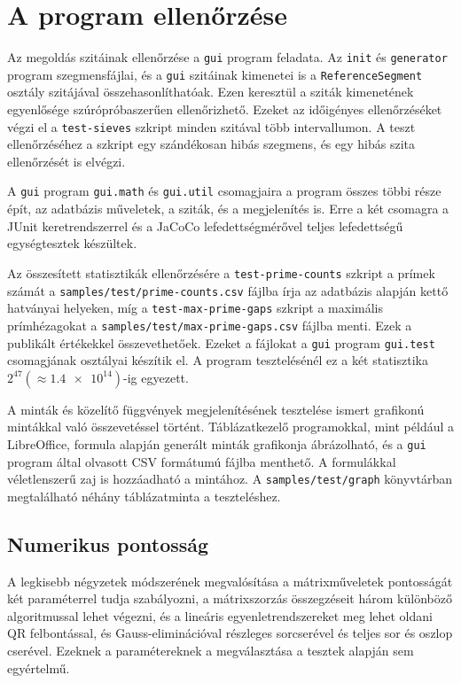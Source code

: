 \pagebreak
\section{A program ellenőrzése}

Az megoldás szitáinak ellenőrzése a \texttt{gui} program feladata.
Az \texttt{init} és \texttt{generator} program szegmensfájlai, és a \texttt{gui} szitáinak kimenetei is a \texttt{ReferenceSegment} osztály szitájával összehasonlíthatóak.
Ezen keresztül a sziták kimenetének egyenlősége szúrópróbaszerűen ellenőrizhető.
Ezeket az időigényes ellenőrzéséket végzi el a \texttt{test-sieves} szkript minden szitával több intervallumon.
A teszt ellenőrzéséhez a szkript egy szándékosan hibás szegmens, és egy hibás szita ellenőrzését is elvégzi.

A \texttt{gui} program \texttt{gui.math} és \texttt{gui.util} csomagjaira a program összes többi része épít, az adatbázis műveletek, a sziták, és a megjelenítés is. Erre a két csomagra a JUnit keretrendszerrel és a JaCoCo lefedettségmérővel teljes lefedettségű egységtesztek készültek.

Az összesített statisztikák ellenőrzésére a \texttt{test-prime-counts} szkript a prímek számát a \texttt{samples/test/prime-counts.csv} fájlba írja az adatbázis alapján kettő hatványai helyeken, míg a \texttt{test-max-prime-gaps} szkript a maximális prímhézagokat a \texttt{samples/test/max-prime-gaps.csv} fájlba menti.
Ezek a publikált értékekkel\cite{gaps}\cite{pi} összevethetőek.
Ezeket a fájlokat a \texttt{gui} program \texttt{gui.test} csomagjának osztályai készítik el.
A program tesztelésénél ez a két statisztika $2^{47}(\approx \num{1,4e14})$-ig egyezett.

A minták és közelítő függvények megjelenítésének tesztelése ismert grafikonú mintákkal való összevetéssel történt.
Táblázatkezelő programokkal, mint például a LibreOffice, formula alapján generált minták grafikonja ábrázolható, és a \texttt{gui} program által olvasott CSV formátumú fájlba menthető.
A formulákkal véletlenszerű zaj is hozzáadható a mintához.
A \texttt{samples/test/graph} könyvtárban megtalálható néhány táblázatminta a teszteléshez.

\subsection{Numerikus pontosság}

A legkisebb négyzetek módszerének megvalósítása a mátrixműveletek pontosságát két paraméterrel tudja szabályozni, a mátrixszorzás összegzéseit három különböző algoritmussal lehet végezni, és a lineáris egyenletrendszereket meg lehet oldani QR felbontással, és Gauss-eliminációval részleges sorcserével és teljes sor és oszlop cserével.
Ezeknek a paramétereknek a megválasztása a tesztek alapján sem egyértelmű.

